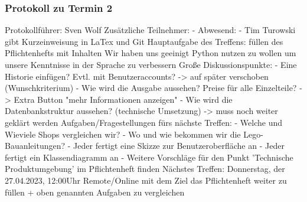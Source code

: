 \subsubsection{Protokoll zu Termin 2}
Protokollführer: Sven Wolf \newline
Zusätzliche Teilnehmer: - \newline
Abwesend: - \newline
Tim Turowski gibt Kurzeinweisung in LaTex und Git \newline
Hauptaufgabe des Treffens: füllen des Pflichtenhefts mit Inhalten \newline
Wir haben uns geeinigt Python nutzen zu wollen um unsere Kenntnisse in der Sprache zu verbessern \newline
Große Diskussionspunkte: \newline
- Eine Historie einfügen? Evtl. mit Benutzeraccounts? -> auf später verschoben (Wunschkriterium) \newline
- Wie wird die Ausgabe aussehen? Preise für alle Einzelteile? -> Extra Button "mehr Informationen anzeigen" \newline
- Wie wird die Datenbankstruktur aussehen? (technische Umsetzung) -> muss noch weiter geklärt werden \newline
Aufgaben/Fragestellungen fürs nächste Treffen: \newline
- Welche und Wieviele Shops vergleichen wir? \newline
- Wo und wie bekommen wir die Lego-Bauanleitungen? \newline
- Jeder fertigt eine Skizze zur Benutzeroberfläche an \newline
- Jeder fertigt ein Klassendiagramm an \newline
- Weitere Vorschläge für den Punkt 'Technische Produktumgebung' im Pflichtenheft finden \newline
Nächstes Treffen: Donnerstag, der 27.04.2023, 12:00Uhr Remote/Online mit dem Ziel das Pflichtenheft weiter zu füllen + oben genannten Aufgaben zu vergleichen \newline

